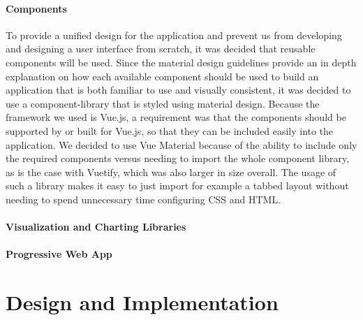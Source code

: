  \subsubsection{Components}
 To provide a unified design for the application and prevent us from developing and designing a user interface from scratch, it was decided that reusable components will be used. Since the material design guidelines provide an in depth explanation on how each available component should be used to build an application that is both familiar to use and visually consistent, it was decided to use a component-library that is styled using material design. Because the framework we used is Vue.js, a requirement was that the components should be supported by or built for Vue.js, so that they can be included easily into the application. We decided to use Vue Material because of the ability to include only the required components versus needing to import the whole component library, as is the case with Vuetify, which was also larger in size overall. The usage of such a library makes it easy to just import for example a tabbed layout without needing to spend unnecessary time configuring CSS and HTML.
 \subsubsection{Visualization and Charting Libraries}
 \subsubsection{Progressive Web App}

\chapter{Design and Implementation}
